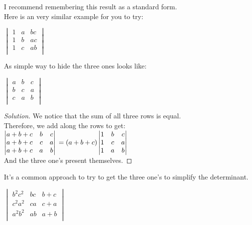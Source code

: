 I recommend remembering this result as a standard form.\\
Here is an very similar example for you to try:\\
\begin{example}
    $\begin{vmatrix}
    1 & a & bc \\
    1 & b & ac \\
    1 & c & ab \\
\end{vmatrix}$
\end{example}
As simple way to hide the three ones looks like:\\
\begin{example}
    $\begin{vmatrix}
    a & b & c \\
    b & c & a \\
    c & a & b \\
\end{vmatrix}$
\end{example}
\begin{proof}
    [Solution]
    We notice that the sum of all three rows is equal.\\
    Therefore, we add along the rows to get:\\
    $\begin{vmatrix}
    a+b+c & b & c \\
    a+b+c & c & a \\
    a+b+c & a & b \\
\end{vmatrix}\\
= (a+b+c) \begin{vmatrix}
    1 & b & c \\
    1 & c & a \\
    1 & a & b \\
\end{vmatrix}$\\
And the three one's  present themselves.
\end{proof}
It's a common approach to try to get the three one's to simplify the determinant.\\
\begin{example}
    $\begin{vmatrix}
    b^2c^2 & bc & b+c \\
    c^2a^2 & ca & c+a \\
    a^2b^2 & ab & a+b \\
\end{vmatrix}$
\end{example}
